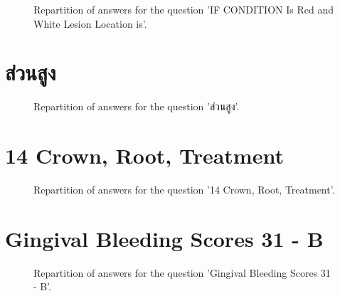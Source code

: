 \documentclass[12pt]{article}
\begin{document}
\label{sec:171}


\begin{figure}[h!]
    \caption{\label{figure:q171-1}Repartition of answers for the question 'IF CONDITION Is Red and White Lesion 
Location is'.}
\end{figure}



\clearpage{}
\section{ส่วนสูง}

\label{sec:17}


\begin{figure}[h!]
    \caption{\label{figure:q17-1}Repartition of answers for the question 'ส่วนสูง'.}
\end{figure}



\clearpage{}
\section{14
Crown, Root, Treatment}

\label{sec:29}


\begin{figure}[h!]
    \caption{\label{figure:q29-1}Repartition of answers for the question '14
Crown, Root, Treatment'.}
\end{figure}



\clearpage{}
\section{Gingival Bleeding Scores
31 - B}

\label{sec:62}


\begin{figure}[h!]
    \caption{\label{figure:q62-1}Repartition of answers for the question 'Gingival Bleeding Scores
31 - B'.}
\end{figure}
\end{document}
